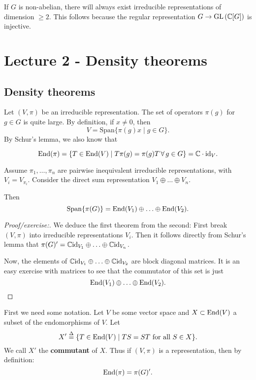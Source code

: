 \documentclass[11pt, english]{article}
\begin{document}
\begin{remark}
  If $G$ is non-abelian, there will always exist irreducible representations of dimension $\geq 2$. This follows because the regular representation $G \to \operatorname{GL} \left( \mathbb{C}[G] \right)$ is injective.
\end{remark}

\newpage
\section{Lecture 2 - Density theorems}

\subsection{Density theorems}

Let $(V,\pi)$ be an irreducible representation. The set of operators $\pi(g)$ for $g \in G$ is quite large. By definition, if $x \neq 0$, then
$$
V = \mathrm{Span} \{ \pi(g)x \mid g \in G \}.
$$
By Schur's lemma, we also know that 

$$
\operatorname{End}(\pi) = \{ T \in \operatorname{End}(V) \mid T\pi(g) = \pi(g) T \, \forall \, g \in G \} = \mathbb{C} \cdot \text{id}_V.
$$

\begin{thm}
\label{thmdensity}
 Assume $\pi_1,\ldots,\pi_n$ are pairwise inequivalent irreducible representations, with $V_i = V_{\pi_i}$. Consider the direct sum representation $V_1 \oplus \ldots \oplus V_n$.

Then
\[ 
\mathrm{Span}\{\pi(G)\} = \operatorname{End}(V_1) \oplus \ldots \oplus \operatorname{End}(V_2).
\]
\end{thm}
\begin{proof}[Proof/exercise:]
We deduce the first theorem from the second: First break $(V,\pi)$ into irreducible representations $V_i$. Then it follows directly from Schur's lemma that $\pi(G)' = \mathbb{C} \text{id}_{V_1} \oplus \ldots \oplus \mathbb{C} \text{id}_{V_n}$. 

Now, the elements of $\mathbb{C} \text{id}_{V_1} \oplus \ldots \oplus \mathbb{C} \text{id}_{V_2}$ are block diagonal matrices. It is an easy exercise with matrices to see that the commutator of this set is just
$$
\operatorname{End}(V_1) \oplus \ldots \oplus \operatorname{End}(V_2).
$$
\end{proof}

First we need some notation. Let $V$ be some vector space and $X \subset \operatorname{End}(V)$ a subset of the endomorphisms of $V$. Let 
\[
X' \stackrel{\Delta}{=}  \{ T \in \operatorname{End}(V) \mid TS = ST \text{ for all } S \in X \}.
\]
We call $X'$ the \textbf{commutant} of $X$. Thus if $(V,\pi)$ is a representation, then by definition:
\[
\operatorname{End}(\pi) = \pi(G)'.
\]
\end{document}
